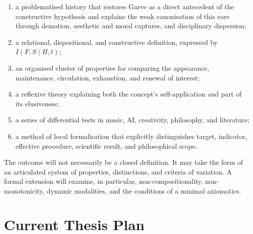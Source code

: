 \documentclass[11pt,a4paper]{article}
\begin{document}
\begin{enumerate}
  \item a problematised history that restores Garve as a direct antecedent of
        the constructive hypothesis and explains the weak canonisation of this
        core through demotion, aesthetic and moral captures, and disciplinary
        dispersion;
  \item a relational, dispositional, and constructive definition, expressed by
        \(I(F,S\mid H,t)\);
  \item an organised cluster of properties for comparing the appearance,
        maintenance, circulation, exhaustion, and renewal of interest;
  \item a reflexive theory explaining both the concept's self-application and
        part of its elusiveness;
  \item a series of differential tests in music, AI, creativity, philosophy,
        and literature;
  \item a method of local formalisation that explicitly distinguishes target,
        indicator, effective procedure, scientific result, and philosophical
        scope.
\end{enumerate}

The outcome will not necessarily be a closed definition. It may take the form
of an articulated system of properties, distinctions, and criteria of
variation. A formal extension will examine, in particular,
non-compositionality, non-monotonicity, dynamic modalities, and the conditions
of a minimal axiomatics.

\section{Current Thesis Plan}
\end{document}
